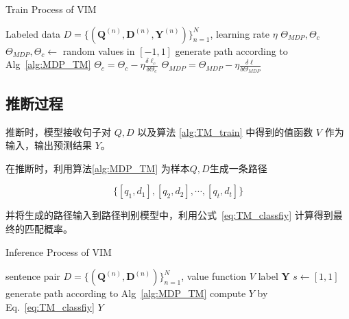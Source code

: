 \begin{algorithm}[!htbp]
    \small
    \caption{Train Process of VIM}\label{alg:TM_train}
    \renewcommand{\algorithmicrequire}{\textbf{Input:}}
    \renewcommand{\algorithmicensure}{\textbf{Output:}}
    \begin{algorithmic}
        \Require Labeled data $D=\{ (\mathbf{Q}^{(n)}, \mathbf{D}^{(n)}, \mathbf{Y}^{(n)})\}_{n=1}^N$, learning rate $\eta$
        \Ensure $\Theta_{MDP}, \Theta_{c}$
        \State {} $\Theta_{MDP}, \Theta_{c} \leftarrow$ random values in $[-1, 1]$
          \State generate path according to Alg~\ref{alg:MDP_TM}
            \State $\Theta_{c} = \Theta_{c} - \eta \frac{\delta \ell_c}{\delta \Theta_{c}}$ 
          \EndWhile
          \State $\Theta_{MDP} = \Theta_{MDP} - \eta \frac{\delta \ell}{\delta \Theta_{MDP}}$ 
        \EndWhile
    \end{algorithmic}
\end{algorithm}

\subsection{推断过程}
推断时，模型接收句子对 $Q, D$ 以及算法 \ref{alg:TM_train} 中得到的值函数 $V$ 作为输入，输出预测结果 $Y$。

在推断时，利用算法\ref{alg:MDP_TM} 为样本$Q, D$生成一条路径

$$\{[q_1, d_1], [q_2, d_2], \cdots, [q_t, d_t]\}$$

并将生成的路径输入到路径判别模型中，利用公式~\ref{eq:TM_classfiy} 计算得到最终的匹配概率。

\begin{algorithm}[!htbp]
    \small
    \caption{Inference Process of VIM}\label{alg:TM_inf}
    \renewcommand{\algorithmicrequire}{\textbf{Input:}}
    \renewcommand{\algorithmicensure}{\textbf{Output:}}
    \begin{algorithmic}
        \Require sentence pair $D=\{ (\mathbf{Q}^{(n)}, \mathbf{D}^{(n)})\}_{n=1}^N$, value function $V$
        \Ensure label $\mathbf{Y}$
        \State $s \leftarrow [1,1]$
        \State generate path according to Alg~\ref{alg:MDP_TM}
        \State compute $Y$ by Eq.~\ref{eq:TM_classfiy}
        \State \Return  $Y$
    \end{algorithmic}
\end{algorithm}

